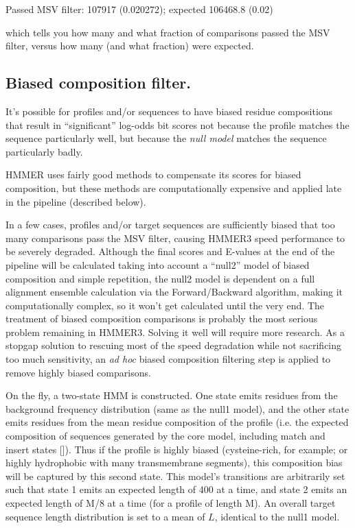 \begin{sreoutput}
 Passed MSV filter:                    107917  (0.020272); expected 106468.8 (0.02)
\end{sreoutput}

 which tells you how many and what fraction of comparisons passed the
 MSV filter, versus how many (and what fraction) were expected. 


\subsection{Biased composition filter.}

It's possible for profiles and/or sequences to have biased residue
compositions that result in ``significant'' log-odds bit scores not
because the profile matches the sequence particularly well, but
because the \emph{null model} matches the sequence particularly badly.

HMMER uses fairly good methods to compensate its scores for biased
composition, but these methods are computationally expensive and
applied late in the pipeline (described below).

In a few cases, profiles and/or target sequences are sufficiently
biased that too many comparisons pass the MSV filter, causing HMMER3
speed performance to be severely degraded. Although the final scores
and E-values at the end of the pipeline will be calculated taking into
account a ``null2'' model of biased composition and simple repetition,
the null2 model is dependent on a full alignment ensemble calculation
via the Forward/Backward algorithm, making it computationally complex,
so it won't get calculated until the very end. The treatment of biased
composition comparisons is probably the most serious problem remaining
in HMMER3. Solving it well will require more research. As a stopgap
solution to rescuing most of the speed degradation while not
sacrificing too much sensitivity, an \emph{ad hoc} biased composition
filtering step is applied to remove highly biased comparisons.

On the fly, a two-state HMM is constructed. One state emits residues
from the background frequency distribution (same as the null1 model),
and the other state emits residues from the mean residue composition
of the profile (i.e. the expected composition of sequences generated
by the core model, including match and insert states
[]). Thus if the profile is
highly biased (cysteine-rich, for example; or highly hydrophobic with
many transmembrane segments), this composition bias will be captured
by this second state. This model's transitions are arbitrarily set
such that state 1 emits an expected length of 400 at a time, and state
2 emits an expected length of M/8 at a time (for a profile of length
M). An overall target sequence length distribution is set to a mean of
$L$, identical to the null1 model.

